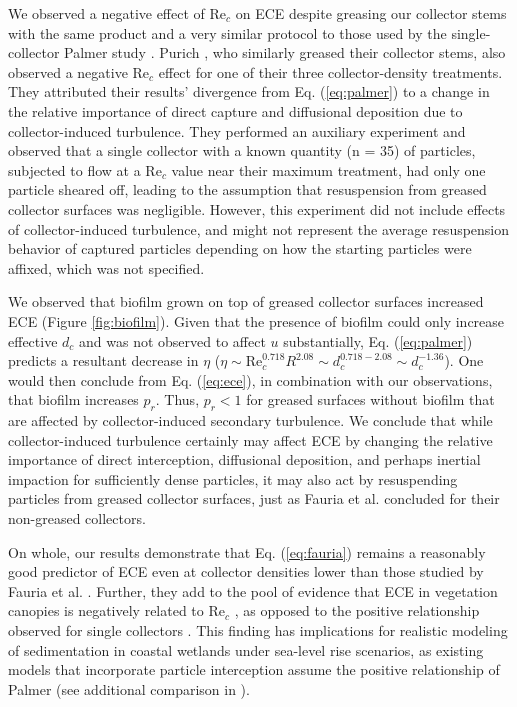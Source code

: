 \documentclass[geosciences,article,submit,moreauthors,pdftex]{Definitions/mdpi}
\newcommand\Rey{\mathrm{Re}}
\begin{document}
We observed a negative effect of $\Rey_c$ on ECE despite greasing our collector stems with the same product and a very similar protocol to those used by the single-collector Palmer study \cite{Palmer_2004}. Purich \citeyear{purich2006capture}, who similarly greased their collector stems, also observed a negative $\Rey_c$ effect for one of their three collector-density treatments. They attributed their results' divergence from Eq. (\ref{eq:palmer}) to a change in the relative importance of direct capture and diffusional deposition due to collector-induced turbulence. They performed an auxiliary experiment and observed that a single collector with a known quantity (n = 35) of particles, subjected to flow at a $\Rey_c$ value near their maximum treatment, had only one particle sheared off, leading to the assumption that resuspension from greased collector surfaces was negligible. However, this experiment did not include effects of collector-induced turbulence, and might not represent the average resuspension behavior of captured particles depending on how the starting particles were affixed, which was not specified. 

We observed that biofilm grown on top of greased collector surfaces increased ECE (Figure \ref{fig:biofilm}). Given that the presence of biofilm could only increase effective $d_c$ and was not observed to affect $u$ substantially, Eq. (\ref{eq:palmer}) predicts a resultant decrease in $\eta$ ($\eta \sim \Rey_c^{0.718}R^{2.08} \sim d_c^{0.718 - 2.08} \sim d_c^{-1.36}$). One would then conclude from Eq. (\ref{eq:ece}), in combination with our observations, that biofilm increases $p_r$. Thus, $p_r < 1$ for greased surfaces without biofilm that are affected by collector-induced secondary turbulence. We conclude that while collector-induced turbulence certainly may affect ECE by changing the relative importance of direct interception, diffusional deposition, and perhaps inertial impaction for sufficiently dense particles, it may also act by resuspending particles from greased collector surfaces, just as Fauria et al. \cite{Fauria_2015} concluded for their non-greased collectors.

On whole, our results demonstrate that Eq. (\ref{eq:fauria}) remains a reasonably good predictor of ECE even at collector densities lower than those studied by Fauria et al. \cite{Fauria_2015}. Further, they add to the pool of evidence that ECE in vegetation canopies is negatively related to $\Rey_c$ \cite{Fauria_2015,purich2006capture,wu2014colloid}, as opposed to the positive relationship observed for single collectors \cite{Palmer_2004}. This finding has implications for realistic modeling of sedimentation in coastal wetlands under sea-level rise scenarios, as existing models that incorporate particle interception \cite{mudd2010does} assume the positive relationship of Palmer \citeyear{Palmer_2004} (see additional comparison in \cite{stein2021}).
\end{document}
